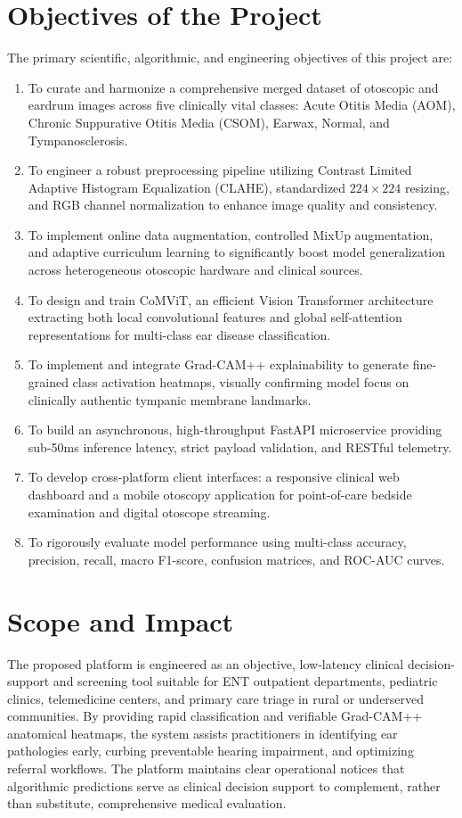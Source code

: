 \documentclass[12pt,a4paper]{report}
\renewcommand{\textbf}[1]{#1}
\begin{document}
\section{Objectives of the Project}
The primary scientific, algorithmic, and engineering objectives of this project are:
\begin{enumerate}
    \item To curate and harmonize a comprehensive merged dataset of otoscopic and eardrum images across five clinically vital classes: Acute Otitis Media (AOM), Chronic Suppurative Otitis Media (CSOM), Earwax, Normal, and Tympanosclerosis.
    \item To engineer a robust preprocessing pipeline utilizing Contrast Limited Adaptive Histogram Equalization (CLAHE), standardized $224 \times 224$ resizing, and RGB channel normalization to enhance image quality and consistency.
    \item To implement online data augmentation, controlled MixUp augmentation, and adaptive curriculum learning to significantly boost model generalization across heterogeneous otoscopic hardware and clinical sources.
    \item To design and train \textbf{CoMViT}, an efficient Vision Transformer architecture extracting both local convolutional features and global self-attention representations for multi-class ear disease classification.
    \item To implement and integrate \textbf{Grad-CAM++} explainability to generate fine-grained class activation heatmaps, visually confirming model focus on clinically authentic tympanic membrane landmarks.
    \item To build an asynchronous, high-throughput \textbf{FastAPI} microservice providing sub-50ms inference latency, strict payload validation, and RESTful telemetry.
    \item To develop cross-platform client interfaces: a responsive clinical web dashboard and a mobile otoscopy application for point-of-care bedside examination and digital otoscope streaming.
    \item To rigorously evaluate model performance using multi-class accuracy, precision, recall, macro F1-score, confusion matrices, and ROC-AUC curves.
\end{enumerate}

\section{Scope and Impact}
The proposed platform is engineered as an objective, low-latency clinical decision-support and screening tool suitable for ENT outpatient departments, pediatric clinics, telemedicine centers, and primary care triage in rural or underserved communities. By providing rapid classification and verifiable Grad-CAM++ anatomical heatmaps, the system assists practitioners in identifying ear pathologies early, curbing preventable hearing impairment, and optimizing referral workflows. The platform maintains clear operational notices that algorithmic predictions serve as clinical decision support to complement, rather than substitute, comprehensive medical evaluation.
\end{document}
